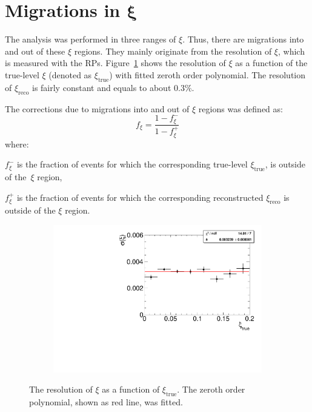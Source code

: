 \section[Migrations of $\xi$]{Migrations in $\mathbf{\xi}$}\label{section:star_xi}
The analysis was performed in three ranges of $\xi$. Thus, there are
migrations into and out of these $\xi$ regions. They mainly originate from the resolution of $\xi$, which is measured with the RPs. Figure~\ref{fig:xi_correction_resolution} shows the resolution of $\xi$ as a function of the true-level $\xi$ (denoted as $\xi_\textrm{true}$) with fitted zeroth order polynomial. The resolution of $\xi_\textrm{reco}$ is fairly constant and equals to about $0.3\%$.

The corrections due to migrations into and out of  $\xi$ regions was defined as:
 \begin{equation}
 f_{\xi} = \frac{1-f_{\xi}^-}{1-f_{\xi}^+}
 \end{equation}
 where:
 \begin{description}
 	\item $f_{\xi}^-$ is the fraction of events for which the corresponding true-level $\xi_\textrm{true}$, is outside of the~$\xi$ region,
 	\item $f_{\xi}^+$  is the fraction of events for which the corresponding reconstructed $\xi_\textrm{reco}$ is outside of the $\xi$ region.
 \end{description}
 \begin{figure}[h!]
 	\centering
 	\begin{subfigure}{.49\textwidth}
 		\includegraphics[width=\textwidth,page=1]{chapters/chrgSTAR/img/xiMigration/RPresolution.pdf}
 	\end{subfigure}
 	\begin{minipage}{.49\textwidth}
 		\caption{The resolution of $\xi$ as a function of $\xi_\textrm{true}$. The zeroth order polynomial, shown as red line, was fitted.}
 		\label{fig:xi_correction_resolution}
 	\end{minipage}
 \end{figure}
